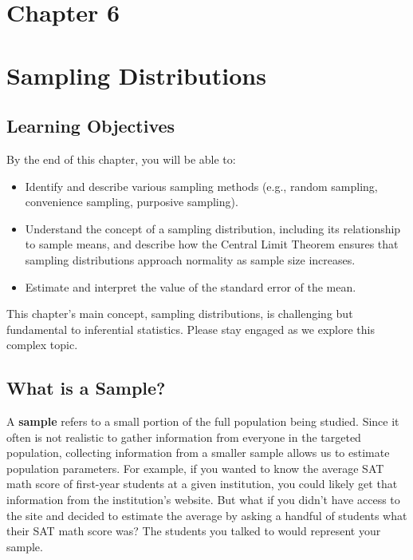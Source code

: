 \documentclass[
  letterpaper,
  DIV=11,
  numbers=noendperiod]{scrreprt}
\begin{document}

\chapter{Chapter 6}\label{chapter-6}


\chapter*{Sampling Distributions}\label{sampling-distributions}


\section*{Learning Objectives}\label{learning-objectives-5}


By the end of this chapter, you will be able to:

\begin{itemize}
\item
  Identify and describe various sampling methods (e.g., random sampling,
  convenience sampling, purposive sampling).
\item
  Understand the concept of a sampling distribution, including its
  relationship to sample means, and describe how the Central Limit
  Theorem ensures that sampling distributions approach normality as
  sample size increases.
\item
  Estimate and interpret the value of the standard error of the mean.
\end{itemize}

This chapter's main concept, sampling distributions, is challenging but
fundamental to inferential statistics. Please stay engaged as we explore
this complex topic.

\section{What is a Sample?}\label{what-is-a-sample}

A \textbf{sample} refers to a small portion of the full population being
studied. Since it often is not realistic to gather information from
everyone in the targeted population, collecting information from a
smaller sample allows us to estimate population parameters. For example,
if you wanted to know the average SAT math score of first-year students
at a given institution, you could likely get that information from the
institution's website. But what if you didn't have access to the site
and decided to estimate the average by asking a handful of students what
their SAT math score was? The students you talked to would represent
your sample.
\end{document}
